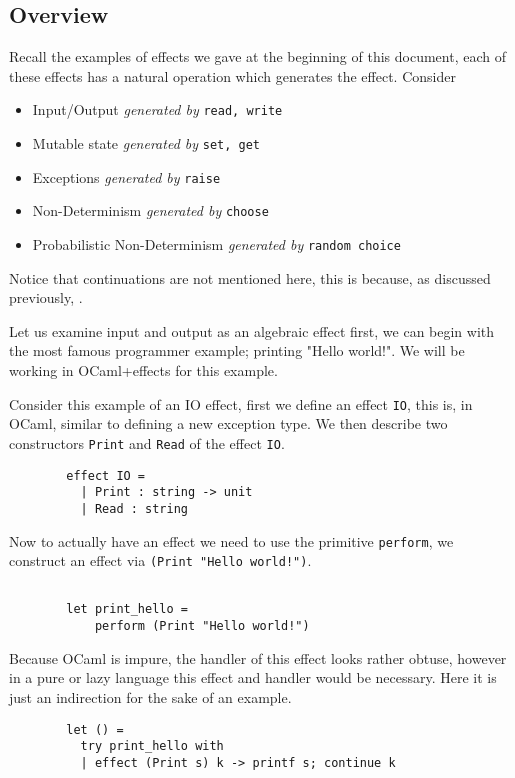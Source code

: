 \subsection{Overview}
\begin{example}
    Recall the examples of effects we gave at the beginning of this document,
    each of these effects has a natural operation which generates the effect.
    Consider
    \begin{itemize}
        \item Input/Output \textit{generated by} \texttt{read, write}
        \item Mutable state \textit{generated by} \texttt{set, get}
        \item Exceptions \textit{generated by} \texttt{raise}
        \item Non-Determinism \textit{generated by} \texttt{choose}
        \item Probabilistic Non-Determinism \textit{generated by} \texttt{random choice}
    \end{itemize}
\end{example}

Notice that continuations are not mentioned here,
this is because, as discussed previously,
\cite{Plotkin:2002dw}\cite{hyland2007combining}.

Let us examine input and output as an algebraic effect first,
we can begin with the most famous programmer example;
printing "Hello world!".
We will be working in OCaml+effects for this example.\\

\begin{example}
    Consider this example of an IO effect,
    first we define an effect \texttt{IO},
    this is, in OCaml, similar to defining
    a new exception type.
    We then describe two constructors
    \texttt{Print} and \texttt{Read}
    of the effect \texttt{IO}.

    \begin{verbatim}
        effect IO =
          | Print : string -> unit
          | Read : string
    \end{verbatim}

    Now to actually have an effect we need to use the primitive \texttt{perform},
    we construct an effect via \texttt{(Print "Hello world!")}.

    \begin{verbatim}

        let print_hello =
            perform (Print "Hello world!")
    \end{verbatim}

    Because OCaml is impure, the handler of this effect looks rather obtuse,
    however in a pure or lazy language this effect and handler would be necessary.
    Here it is just an indirection for the sake of an example.

    \begin{verbatim}
        let () =
          try print_hello with
          | effect (Print s) k -> printf s; continue k
    \end{verbatim}
\end{example}

